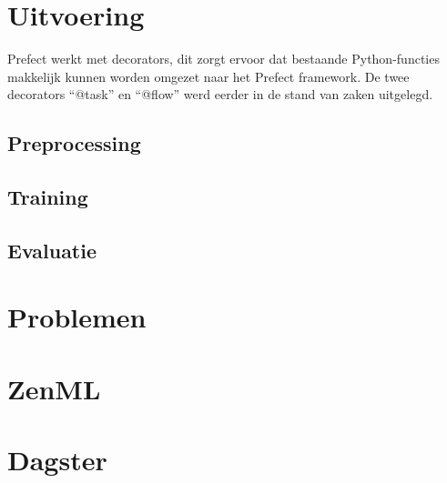 \section{Uitvoering}
Prefect werkt met decorators, dit zorgt ervoor dat bestaande Python-functies makkelijk kunnen worden omgezet naar het Prefect framework. De twee decorators ``@task'' en ``@flow'' werd  eerder in de stand van zaken uitgelegd.
\subsection{Preprocessing}
\subsection{Training}
\subsection{Evaluatie}
\section{Problemen}
\section{ZenML}

\section{Dagster}



